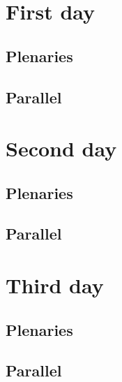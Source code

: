 


\tableofcontents
\clearpage
\section{First day}

\subsection{ Plenaries}


\subsection{Parallel}


\clearpage
\section{Second day}

\subsection{Plenaries}


\subsection{Parallel}


\clearpage
\section{Third day}

\subsection{Plenaries}


\subsection{Parallel}



